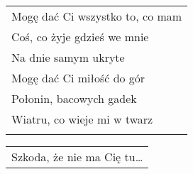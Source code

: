 \documentclass[a5paper]{article}
\begin{document}
\noindent
\begin{tabular}{@{}p{7.50cm}@{}}
Mogę dać Ci wszystko to, co mam \\
Coś, co żyje gdzieś we mnie \\
Na dnie samym ukryte \\
Mogę dać Ci miłość do gór \\
Połonin, bacowych gadek \\
Wiatru, co wieje mi w twarz \\ \\
\end{tabular}

\noindent
\begin{tabular}{@{}p{6.50cm}@{}}
Szkoda, że nie ma Cię tu…
\end{tabular}
\end{document}
